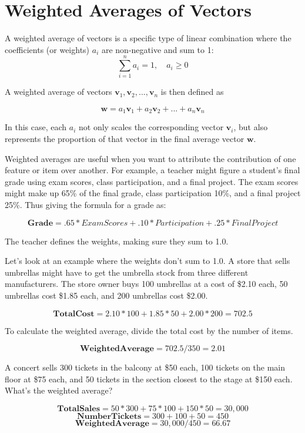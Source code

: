 \section{Weighted Averages of Vectors}
A weighted average of vectors is a specific type of linear combination
where the coefficients (or weights) $a_i$ are non-negative and sum to
1:
\[
\sum_{i=1}^{n} a_i = 1, \quad a_i \geq 0
\]

A weighted average of vectors $\mathbf{v}_1, \mathbf{v}_2, ...,
\mathbf{v}_n$ is then defined as

\[
\mathbf{w} = a_1\mathbf{v}_1 + a_2\mathbf{v}_2 + ... + a_n\mathbf{v}_n
\]

In this case, each $a_i$ not only scales the corresponding vector
$\mathbf{v}_i$, but also represents the proportion of that vector in
the final average vector $\mathbf{w}$.

Weighted averages are useful when you want to attribute the contribution of one feature or item over another. For example, a teacher might figure a student's final grade using exam scores, class participation, and a final project. The exam scores might make up 65\% of the final grade, class participation 10\%, and a final project 25\%. Thus giving the formula for a grade as:

\[
\mathbf{Grade} = .65*ExamScores + .10*Participation + .25*FinalProject
\]

The teacher defines the weights, making sure they sum to 1.0. 

Let's look at an example where the weights don't sum to 1.0. A store that sells umbrellas might have to get the umbrella stock from three different manufacturers. The store owner buys 100 umbrellas at a cost of \$2.10 each, 50 umbrellas cost \$1.85 each, and 200 umbrellas cost \$2.00. 

\[
\mathbf{TotalCost} = 2.10*100 + 1.85*50 + 2.00*200 = 702.5
\]

To calculate the weighted average, divide the total cost by the number of items.

\[
\mathbf{WeightedAverage} = 702.5/350 = 2.01 
\]

\begin{Exercise}[title={Weighted Average}, label=weightedAverage]
A concert sells 300 tickets in the balcony at \$50 each, 100 tickets on the main floor at \$75 each, and 50 tickets in the section closest to the stage at \$150 each. What's the weighted average?
\end{Exercise}
\begin{Answer}[ref=weightedAverage]
\[\mathbf{TotalSales} = 50*300 + 75*100 + 150*50 = 30,000\]
\[\mathbf{NumberTickets} = 300 + 100 + 50 = 450\]
\[\mathbf{WeightedAverage} = 30,000/450 = 66.67\]
\end{Answer}

